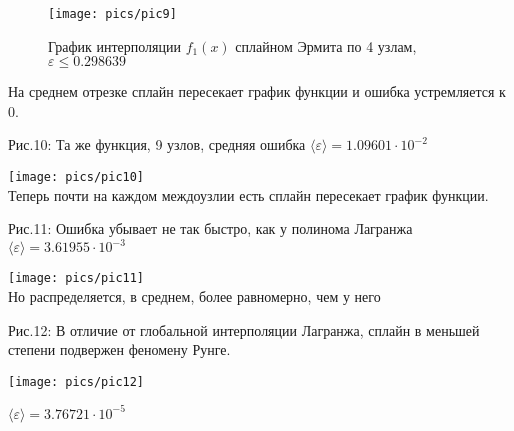 \begin{figure}[H]
    \centering
    \caption{График интерполяции $f_1(x)$ сплайном Эрмита по 4 узлам, $\varepsilon \le 0.298639$}
    \texttt{[image: pics/pic9]}
    \label{pic:9}
\end{figure}
На среднем отрезке сплайн пересекает график функции и ошибка устремляется к $0$.


\vspace{-0.5cm}
{\normalsize Рис.10: Та же функция, 9 узлов, средняя ошибка $\langle\varepsilon\rangle=1.09601\cdot10^{-2}$}
\begin{center}
    \texttt{[image: pics/pic10]}\\
    \vspace{-0.7cm}
    {\small Теперь почти на каждом междоузлии есть сплайн пересекает график функции.}
\end{center}


\newpage
{\normalsize Рис.11: Ошибка убывает не так быстро, как у полинома Лагранжа $\langle\varepsilon\rangle=3.61955\cdot10^{-3}$}
\begin{center}
    \texttt{[image: pics/pic11]}\\
    \vspace{-0.7cm}
    {\small Но распределяется, в среднем, более равномерно, чем у него}
\end{center}
\vspace{-0.7cm}
{\normalsize Рис.12: В отличие от глобальной интерполяции Лагранжа, сплайн в меньшей степени подвержен феномену Рунге.}
\begin{center}
    \texttt{[image: pics/pic12]}
    \vspace{-0.7cm}
\end{center}

{\small $\langle\varepsilon\rangle=3.76721\cdot10^{-5}$}


